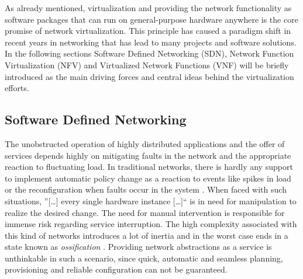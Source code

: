 As already mentioned, virtualization and providing the network functionality as software packages that can run on general-purpose hardware anywhere is the core promise of network virtualization. This principle has caused a paradigm shift in recent years in networking that has lead to many projects and software solutions. In the following sections Software Defined Networking (SDN), Network Function Virtualization (NFV) and Virtualized Network Functions (VNF) will be briefly introduced as the main driving forces and central ideas behind the virtualization efforts. 


\subsection{Software Defined Networking}
\label{sec:sdn}

The unobstructed operation of highly distributed applications and the offer of services depends highly on mitigating faults in the network and the appropriate reaction to fluctuating load. In traditional networks, there is hardly any support to implement automatic policy change as a reaction to events like spikes in load or the reconfiguration when faults occur in the system \cite{kreutz2015software}. When faced with such situations, ''[\dots] every single hardware instance [\dots]`` \cite{grossmann2013auto} is in need for manipulation to realize the desired change.  The need for manual intervention is responsible for immense risk regarding service interruption. The high complexity associated with this kind of networks introduces a lot of inertia and in the worst case ends in a state known as \textit{ossification} \cite{nunes2014survey}. Providing network abstractions as a service is unthinkable in such a scenario, since quick, automatic and seamless planning, provisioning and reliable configuration can not be guaranteed.

